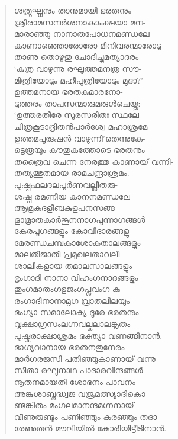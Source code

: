 \begin{verse}
ശത്രുഘ്നനും താനുമായി ഭരതനും\\
ശ്രീരാമസന്ദര്‍ശനാകാംക്ഷയാ മന്ദ-\\
മാരാഞ്ഞു നാനാതപോധനമണ്ഡലേ\\
കാണാഞ്ഞൊരോരോ മിനിവരന്മാരോടു\\
താണു തൊഴുതു ചോദിച്ചുമത്യാദരം\\
‘കുത്ര വാഴുന്നു രഘൂത്തമനത്ര സൗ-\\
മിത്രിയോടും മഹീപുത്രിയോടും മുദാ?’\\
ഉത്തമനായ ഭരതകുമാരനോ-\\
ടുത്തരം താപസന്മാരുമരുള്‍ചെയ്തു:\\
‘ഉത്തരതീരേ സുരസരിതഃ സ്ഥലേ\\
ചിത്രകൂടാദ്രിതന്‍പാര്‍ശ്വേ മഹാശ്രമേ\\
ഉത്തമപൂരുഷന്‍ വാഴുന്നി’തെന്നുകേ-\\
ട്ടെത്രയും കൗതുകത്തോടെ ഭരതനും\\
തത്രൈവ ചെന്ന നേരത്തു കാണായ് വന്നി-\\
തത്യത്ഭുതമായ രാമചന്ദ്രാശ്രമം.\\
പുഷ്പഫലദലപൂര്‍ണവല്ലീതരു-\\
ശഷ്പ രമണീയ കാനനമണ്ഡലേ\\
ആമ്രകദളീബകുളപനസങ്ങ-\\
ളാമ്രാതകാര്‍ജുനനാഗപുന്നാഗങ്ങള്‍\\
കേരപൂഗങ്ങളും കോവിദാരങ്ങളു-\\
മേരണ്ഡചമ്പകാശോകതാലങ്ങളും\\
മാലതീജാതി പ്രമുഖലതാവലീ-\\
ശാലികളായ തമാലസാലങ്ങളും\\
ഭൃംഗാദി നാനാ വിഹംഗനാദങ്ങളും\\
തുംഗമാതംഗഭുജംഗപ്ലവംഗ കു-\\
രംഗാദിനാനാമൃഗ വ്രാതലീലയും\\
ഭംഗ്യാ സമാലോക്യ ദൂരേ ഭരതനും\\
വൃക്ഷാഗ്രസംലഗ്നവല്കലാലങ്കൃതം\\
പുഷ്കരാക്ഷാശ്രമം ഭക്ത്യാ വണങ്ങിനാന്‍.\\
ഭാഗ്യവാനായ ഭരതനതുനേരം\\
മാര്‍ഗരജസി പതിഞ്ഞുകാണായ് വന്നു\\
സീതാ രഘുനാഥ പാദാരവിന്ദങ്ങള്‍\\
നൂതനമായതി ശോഭനം പാവനം\\
അങ്കുശാബ്ജദ്ധ്വജ വജ്രമത്സ്യാദികൊ-\\
ണ്ടങ്കിതം മംഗലമാനന്ദമഗ്നനായ്\\
വീണുരുണ്ടും പണിഞ്ഞും കരഞ്ഞും തദാ\\
രേണുതന്‍ മൗലിയില്‍ കോരിയിട്ടീടിനാന്‍.\\

\end{verse}
